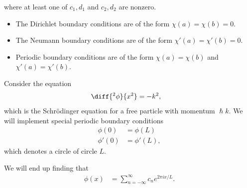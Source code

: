 \documentclass[10pt]{mypackage}
\renewcommand*{\hbar}{\hslash}
\begin{document}
  where at least one of $c_1,d_1$ and $c_2,d_2$ are nonzero. 
  \begin{itemize}
    \item The Dirichlet boundary conditions are of the form $\chi(a) = \chi(b) = 0$.
    \item The Neumann boundary conditions are of the form $\chi'(a) = \chi'(b) = 0$.
    \item Periodic boundary conditions are of the form $\chi(a) = \chi(b)$ and $\chi'(a) = \chi'(b)$.
  \end{itemize}
  \begin{example}
    Consider the equation
    \begin{align*}
      \diff{^2\phi}{x^2} &= -k^2,
    \end{align*}
    which is the Schrödinger equation for a free particle with momentum $\hbar k$. We will implement special periodic boundary conditions
    \begin{align*}
      \phi(0) &= \phi(L)\\
      \phi'(0) &= \phi'(L),
    \end{align*}
    which denotes a circle of circle $L$.\newline

    We will end up finding that
    \begin{align*}
      \phi(x) &= \sum_{n=-\infty}^{\infty}c_ne^{2\pi i x/L}.
    \end{align*}
  \end{example}
\end{document}
